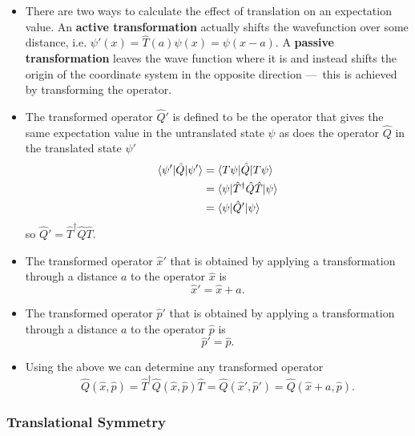 \documentclass{article}
\begin{document}
\begin{itemize}
  \item There are two ways to calculate the effect of translation on an expectation value. An \textbf{active transformation} actually shifts the wavefunction over some distance, i.e. $\psi'(x) = \hat{T}(a) \psi(x) = \psi(x - a)$. A \textbf{passive transformation} leaves the wave function where it is and instead shifts the origin of the coordinate system in the opposite direction — this is achieved by transforming the operator.

  \item The transformed operator $\hat{Q}'$ is defined to be the operator that gives the same expectation value in the untranslated state $\psi$ as does the operator $\hat{Q}$ in the translated state $\psi'$ \begin{align*}
          \braket{\psi' | \hat{Q} | \psi'} & = \braket{T \psi | \hat{Q} | T \psi}                     \\
                                           & = \braket{\psi | \hat{T}^\dagger \hat{Q} \hat{T} | \psi} \\
                                           & = \braket{\psi | \hat{Q}' | \psi}
        \end{align*} so $\hat{Q}' = \hat{T}^\dagger \hat{Q} \hat{T}$.

  \item The transformed operator $\hat{x}'$ that is obtained by applying a transformation through a distance $a$ to the operator $\hat{x}$ is \[\hat{x}' = \hat{x} + a.\]

  \item The transformed operator $\hat{p}'$ that is obtained by applying a transformation through a distance $a$ to the operator $\hat{p}$ is \[\hat{p}' = \hat{p}.\]

  \item Using the above we can determine any transformed operator \[\hat{Q}(\hat{x}, \hat{p}) = \hat{T}^\dagger \hat{Q}(\hat{x}, \hat{p}) \hat{T} = \hat{Q}(\hat{x}', \hat{p}') = \hat{Q}(\hat{x} + a, \hat{p}).\]
\end{itemize}

\subsubsection{Translational Symmetry}
\end{document}
